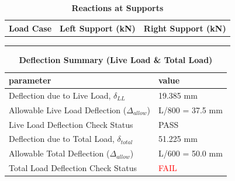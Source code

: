 \documentclass[12pt,a4paper]{report}
\numberwithin{table}{chapter}
\numberwithin{figure}{chapter}
\begin{document}
\vspace{1em}
\begin{longtable}{|>{\centering\arraybackslash}p{5.2cm}|>{\centering\arraybackslash}p{5.2cm}|>{\centering\arraybackslash}p{5.2cm}|}
\caption{\textbf{Reactions at Supports}}
\hline
\textbf{Load Case} & \textbf{Left Support (kN)} & \textbf{Right Support (kN)} \\[6pt]
\hline
 &  &  \\[6pt]
\hline
 &  &  \\[6pt]
\hline
 &  &  \\[6pt]
\hline
\end{longtable}

\vspace{1em}
\begin{longtable}{|L{7cm}|p{8.5cm}|}
\caption{\textbf{Deflection Summary (Live Load \& Total Load)}}
\hline
\textbf{parameter} & \textbf{value} \\
\hline
\textnormal{Deflection due to Live Load, $\delta_{LL}$} & 19.385 mm \\[6pt]
\hline
\textnormal{Allowable Live Load Deflection ($\Delta_{allow}$)} & L/800 = 37.5 mm \\[6pt]
\hline
\textnormal{Live Load Deflection Check Status} & PASS \\[6pt]
\hline
\textnormal{Deflection due to Total Load, $\delta_{total}$} & 51.225 mm \\[6pt]
\hline
\textnormal{Allowable Total Deflection ($\Delta_{allow}$)} & L/600 = 50.0 mm \\[6pt]
\hline
\textnormal{Total Load Deflection Check Status} & \textcolor{red}{FAIL} \\[6pt]
\hline
\end{longtable}
\end{document}
